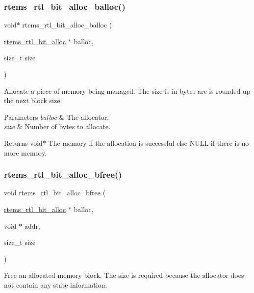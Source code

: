 \subsubsection{\texorpdfstring{rtems\_rtl\_bit\_alloc\_balloc()}{rtems\_rtl\_bit\_alloc\_balloc()}}
{\footnotesize\ttfamily void$\ast$ rtems\+\_\+rtl\+\_\+bit\+\_\+alloc\+\_\+balloc (\begin{DoxyParamCaption}\item[{\mbox{\hyperlink{structrtems__rtl__bit__alloc}{rtems\+\_\+rtl\+\_\+bit\+\_\+alloc}} $\ast$}]{balloc,  }\item[{size\+\_\+t}]{size }\end{DoxyParamCaption})}

Allocate a piece of memory being managed. The size is in bytes are is rounded up the next block size.


\begin{DoxyParams}{Parameters}
{\em balloc} & The allocator. \\
\hline
{\em size} & Number of bytes to allocate. \\
\hline
\end{DoxyParams}
\begin{DoxyReturn}{Returns}
void$\ast$ The memory if the allocation is successful else N\+U\+LL if there is no more memory. 
\end{DoxyReturn}
\mbox{\label{rtl-bit-alloc_8c_aa895314e00bf91d5561c34e032f3ff58}} 
\subsubsection{\texorpdfstring{rtems\_rtl\_bit\_alloc\_bfree()}{rtems\_rtl\_bit\_alloc\_bfree()}}
{\footnotesize\ttfamily void rtems\+\_\+rtl\+\_\+bit\+\_\+alloc\+\_\+bfree (\begin{DoxyParamCaption}\item[{\mbox{\hyperlink{structrtems__rtl__bit__alloc}{rtems\+\_\+rtl\+\_\+bit\+\_\+alloc}} $\ast$}]{balloc,  }\item[{void $\ast$}]{addr,  }\item[{size\+\_\+t}]{size }\end{DoxyParamCaption})}

Free an allocated memory block. The size is required because the allocator does not contain any state information. \mbox{\label{rtl-bit-alloc_8c_ae20e516fc07b19dc0d56f5ed4a83e677}} 

